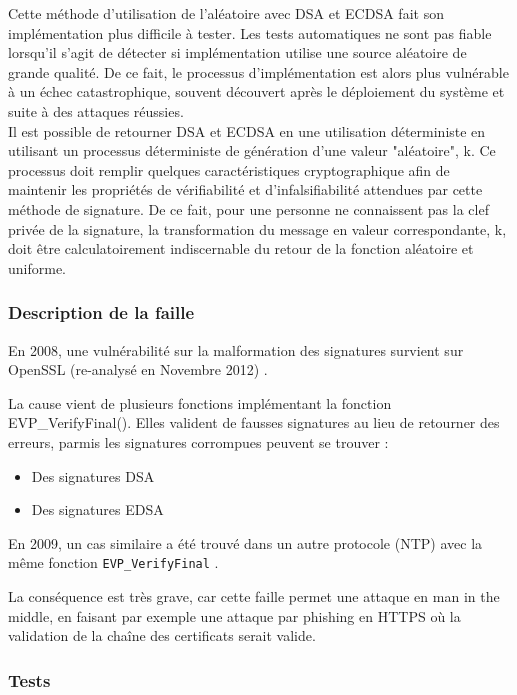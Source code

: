 		Cette méthode d'utilisation de l'aléatoire avec DSA et ECDSA fait son implémentation plus difficile à tester. Les tests automatiques ne sont pas fiable lorsqu'il s'agit de détecter si implémentation utilise une source aléatoire de grande qualité. De ce fait, le processus d'implémentation est alors plus vulnérable à un échec catastrophique, souvent découvert après le déploiement du système et suite à des attaques réussies.\\

		Il est possible de retourner DSA et ECDSA en une utilisation déterministe en utilisant un processus déterministe de génération d'une valeur "aléatoire", k. Ce processus doit remplir quelques caractéristiques cryptographique afin de maintenir les propriétés de vérifiabilité et d'infalsifiabilité attendues par cette méthode de signature. De ce fait, pour une personne ne connaissent pas la clef privée de la signature, la transformation du message en valeur correspondante, k, doit être calculatoirement indiscernable du retour de la fonction aléatoire et uniforme.
		
		\subsubsection{Description de la faille}
			
		En 2008, une vulnérabilité sur la malformation des signatures survient sur OpenSSL (re-analysé en Novembre 2012) \cite{openssl2009secadv} \cite{cve-2008-5077}. 

		La cause vient de plusieurs fonctions implémentant la fonction EVP\_VerifyFinal(). Elles valident de fausses signatures au lieu de retourner des erreurs, parmis les signatures corrompues peuvent se trouver :
		\begin{itemize}
		\item Des signatures DSA
		\item Des signatures EDSA
		\end{itemize}

		En 2009, un cas similaire a été trouvé dans un autre protocole (NTP) avec la même fonction \texttt{EVP\_VerifyFinal} \cite{cve-2009-0021}.

		La conséquence est très grave, car cette faille permet une attaque en man in the middle, en faisant par exemple une attaque par phishing en HTTPS où la validation de la chaîne des certificats serait valide.

		\subsubsection{Tests}

